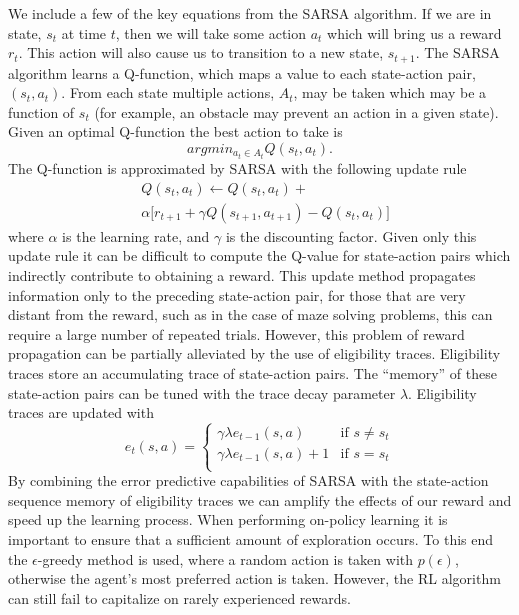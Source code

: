 We include a few of the key equations from the SARSA algorithm. If we are in state,
$s_t$ at time $t$, then we will take some action $a_t$ which will bring us a
reward $r_t$. This action will also cause us to transition to a new state,
$s_{t+1}$. The SARSA algorithm learns a Q-function, which maps a value to each 
state-action pair, $(s_t,a_t)$. From each state multiple actions, $A_t$, may be taken
which may be a function of $s_t$ (for example, an obstacle may prevent an action
in a given state). Given an optimal Q-function the best action to take is
\begin{equation} argmin_{a_t \in A_t} Q(s_t,a_t).
\end{equation}
\noindent The Q-function is approximated by SARSA with the following update rule
\begin{eqnarray} 
& Q(s_t,a_t) \leftarrow Q(s_t,a_t)+ \nonumber \\ 
& \alpha \big[r_{t+1}+\gamma Q(s_{t+1},a_{t+1}) - Q(s_t,a_t)\big] 
\end{eqnarray}
\noindent where $\alpha$ is the learning rate, and $\gamma$ is the discounting
factor. Given only this update rule it can be difficult to compute the Q-value
for state-action pairs which indirectly contribute to obtaining a reward. This
update method propagates information only to the preceding state-action pair,
for those that are very distant from the reward, such as in the case of maze
solving problems, this can require a large number of repeated trials. However,
this problem of reward propagation can be partially alleviated by the use of
eligibility traces. Eligibility traces store an accumulating trace of
state-action pairs. The ``memory'' of these state-action pairs can be tuned with
the trace decay parameter $\lambda$. Eligibility traces are updated with
\begin{equation}
e_t(s,a) = 	\begin{cases}
			\gamma \lambda e_{t-1}(s,a) & \mbox{if } s \neq s_t \\ 
			\gamma \lambda e_{t-1}(s,a)+1 & \mbox{if }s = s_t \\
			\end{cases}
\end{equation} 
\noindent By combining the error predictive capabilities of SARSA with the
state-action sequence memory of eligibility traces we can amplify the effects
of our reward and speed up the learning process. When performing on-policy
learning it is important to ensure that a sufficient amount of exploration
occurs. To this end the $\epsilon$-greedy method is used, where a random
action is taken with $p(\epsilon)$, otherwise the agent's most preferred 
action is taken. However, the RL algorithm can still fail to capitalize on rarely
experienced rewards. 